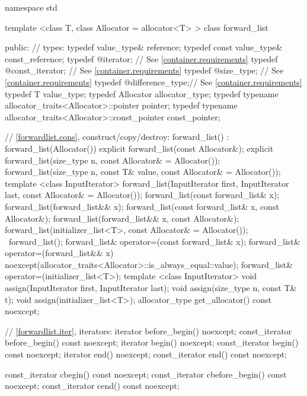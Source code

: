 \begin{codeblock}
namespace std {
  template <class T, class Allocator = allocator<T> >
  class forward_list {
  public:
    // types:
    typedef value_type&                                           reference;
    typedef const value_type&                                     const_reference;
    typedef @\impdef@ iterator;       // See \ref{container.requirements}
    typedef @\impdef@ const_iterator; // See \ref{container.requirements}
    typedef @\impdef@ size_type;      // See \ref{container.requirements}
    typedef @\impdef@ difference_type;// See \ref{container.requirements}
    typedef T value_type;
    typedef Allocator allocator_type;
    typedef typename allocator_traits<Allocator>::pointer         pointer;
    typedef typename allocator_traits<Allocator>::const_pointer   const_pointer;

    // \ref{forwardlist.cons}, construct/copy/destroy:
    forward_list() : forward_list(Allocator()) { }
    explicit forward_list(const Allocator&);
    explicit forward_list(size_type n, const Allocator& = Allocator());
    forward_list(size_type n, const T& value,
                 const Allocator& = Allocator());
    template <class InputIterator>
      forward_list(InputIterator first, InputIterator last,
                   const Allocator& = Allocator());
    forward_list(const forward_list& x);
    forward_list(forward_list&& x);
    forward_list(const forward_list& x, const Allocator&);
    forward_list(forward_list&& x, const Allocator&);
    forward_list(initializer_list<T>, const Allocator& = Allocator());
    ~forward_list();
    forward_list& operator=(const forward_list& x);
    forward_list& operator=(forward_list&& x)
      noexcept(allocator_traits<Allocator>::is_always_equal::value);
    forward_list& operator=(initializer_list<T>);
    template <class InputIterator>
      void assign(InputIterator first, InputIterator last);
    void assign(size_type n, const T& t);
    void assign(initializer_list<T>);
    allocator_type get_allocator() const noexcept;

    // \ref{forwardlist.iter}, iterators:
    iterator before_begin() noexcept;
    const_iterator before_begin() const noexcept;
    iterator begin() noexcept;
    const_iterator begin() const noexcept;
    iterator end() noexcept;
    const_iterator end() const noexcept;

    const_iterator cbegin() const noexcept;
    const_iterator cbefore_begin() const noexcept;
    const_iterator cend() const noexcept;

}}
\end{codeblock}
